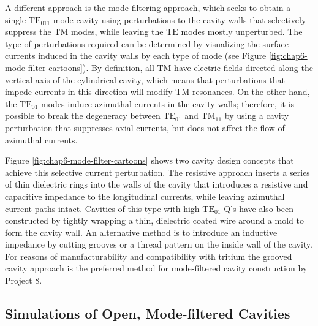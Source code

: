 A different approach is the mode filtering approach, which seeks to obtain a single $\mathrm{TE}_{011}$ mode cavity using perturbations to the cavity walls that selectively suppress the $\mathrm{TM}$ modes, while leaving the $\mathrm{TE}$ modes mostly unperturbed.
The type of perturbations required can be determined by visualizing the surface currents induced in the cavity walls by each type of mode (see Figure \ref{fig:chap6-mode-filter-cartoons}). By definition, all $\mathrm{TM}$ have electric fields directed along the vertical axis of the cylindrical cavity, which means that perturbations that impede currents in this direction will modify $\mathrm{TM}$ resonances. On the other hand, the $\mathrm{TE}_{01}$ modes induce azimuthal currents in the cavity walls; therefore, it is possible to break the degeneracy between $\mathrm{TE}_{01}$ and $\mathrm{TM}_{11}$ by using a cavity perturbation that suppresses axial currents, but does not affect the flow of azimuthal currents. 

Figure \ref{fig:chap6-mode-filter-cartoons} shows two cavity design concepts that achieve this selective current perturbation. The resistive approach inserts a series of thin dielectric rings into the walls of the cavity that introduces a resistive and capacitive impedance to the longitudinal currents, while leaving azimuthal current paths intact. Cavities of this type with high $\mathrm{TE}_{01}$ Q's have also been constructed by tightly wrapping a thin, dielectric coated wire around a mold to form the cavity wall. An alternative method is to introduce an inductive impedance by cutting grooves or a thread pattern on the inside wall of the cavity. For reasons of manufacturability and compatibility with tritium the grooved cavity approach is the preferred method for mode-filtered cavity construction by Project 8. 

\subsection{Simulations of Open, Mode-filtered Cavities}


